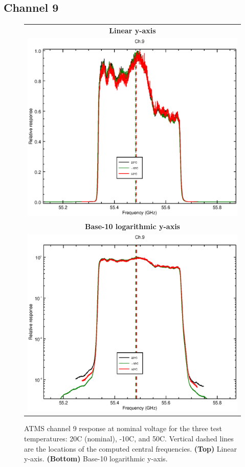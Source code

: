\subsection{Channel 9}
\begin{figure}[H]
  \label{fig:Tset.ch9_response}
  \centering
  \begin{tabular}{c}
    \hspace{1.75cm}\sffamily\textbf{Linear y-axis} \\
    \includegraphics[scale=0.55]{graphics/srf/Tset/lin/atms_npp-9.eps} \\
    \hspace{1.75cm}\sffamily\textbf{Base-10 logarithmic y-axis} \\
    \includegraphics[scale=0.55]{graphics/srf/Tset/log/atms_npp-9.eps}
  \end{tabular}
  \caption{ATMS channel 9 response at nominal voltage for the three test temperatures: 20\textdegree{}C (nominal), -10\textdegree{}C, and 50\textdegree{}C. Vertical dashed lines are the locations of the computed central frequencies. \textbf{(Top)} Linear y-axis. \textbf{(Bottom)} Base-10 logarithmic y-axis.}
\end{figure}

